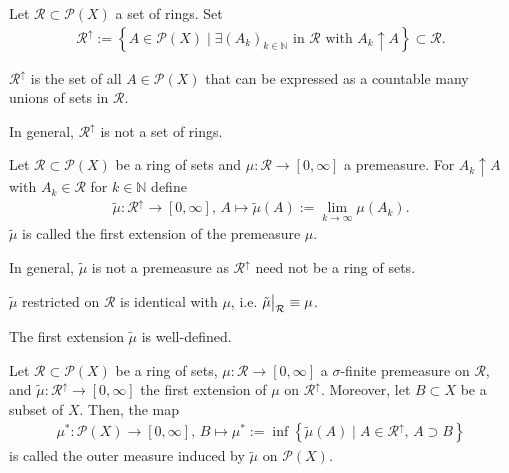 \begin{definition}
    Let \(\mathcal{R} \subset \mathcal{P}(X)\) a set of rings. Set
    \begin{align}
        \mathcal{R}^{\uparrow} := \left\{ A \in \mathcal{P}(X) \mid \exists (A_k)_{k \in \mathbb{N}} \text{ in } \mathcal{R} \text{ with } A_k \uparrow A \right\} \subset \mathcal{R} \text{.}
    \end{align}
\end{definition}
\begin{remark}
    \(\mathcal{R}^\uparrow\) is the set of all \(A \in \mathcal{P}(X)\) that can be expressed as a countable many unions of sets in \(\mathcal{R}\).

    In general, \(\mathcal{R}^\uparrow\) is not a set of rings.
\end{remark}
\begin{definition}
    Let \(\mathcal{R} \subset \mathcal{P}(X)\) be a ring of sets and \(\mu: \mathcal{R} \rightarrow [0, \infty]\) a premeasure. For \(A_k \uparrow A\) with \(A_k \in \mathcal{R}\) for \(k \in \mathbb{N}\) define
    \begin{align}
        \tilde{\mu}: \mathcal{R}^\uparrow \rightarrow [0, \infty], \, A \mapsto \tilde{\mu}(A) := \lim_{k \rightarrow \infty} \mu(A_k)\text{.}
    \end{align}
    \(\tilde{\mu}\) is called the first extension of the premeasure \(\mu\).
\end{definition}
\begin{remark}
    In general, \(\tilde{\mu}\) is not a premeasure as \(\mathcal{R}^\uparrow\) need not be a ring of sets.

    \(\tilde{\mu}\) restricted on \(\mathcal{R}\) is identical with \(\mu\), i.e. \(\restr{\tilde{\mu}}{\mathcal{R}} \equiv \mu \).
\end{remark}
\begin{lemma}
    The first extension \(\tilde{\mu}\) is well-defined.
\end{lemma}
\begin{proposition}
    
\end{proposition}
\begin{proposition}
    
\end{proposition}
\begin{definition}
    Let \(\mathcal{R} \subset \mathcal{P}(X)\) be a ring of sets, \(\mu: \mathcal{R} \rightarrow [0, \infty]\) a \(\sigma\)-finite premeasure on \(\mathcal{R}\), and \(\tilde{\mu}: \mathcal{R}^\uparrow \rightarrow [0, \infty]\) the first extension of \(\mu\) on \(\mathcal{R}^\uparrow\). Moreover, let \(B \subset X\) be a subset of \(X\). Then, the map
    \begin{align}
        \mu^*: \mathcal{P}(X) \rightarrow [0, \infty], \, B \mapsto \mu^* := \inf \left\{ \tilde\mu(A) \mid A \in \mathcal{R}^\uparrow, \, A \supset B \right\}
    \end{align}
    is called the outer measure induced by \(\tilde{\mu}\) on \(\mathcal{P}(X)\).
\end{definition}

